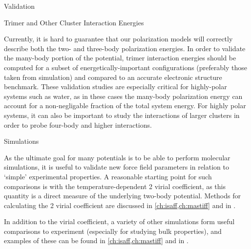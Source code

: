 \begin{subsection}{Validation}

\begin{paragraph}{Trimer and Other Cluster Interaction Energies}

Currently, it is hard to guarantee that our polarization models will
correctly describe both the two- and three-body polarization energies. In
order to validate the many-body portion of the potential, trimer
interaction energies should be computed for a subset of energetically-important configurations
(preferably those taken from simulation) and compared to an accurate
electronic structure benchmark. These validation studies are especially
critical for highly-polar systems such as water, as in these cases the
many-body polarization energy can account for a non-negligable fraction of the
total system energy. For highly polar systems, it can also be important to study
the interactions of larger clusters in order to probe four-body and higher
interactions.\cite{Medders2015a,Cisneros2016,Medders2013}

\end{paragraph}

\begin{paragraph}{Simulations}

As the ultimate goal for many potentials is to be able to perform molecular
simulations, it is useful to validate new force field parameters in relation
to `simple' experimental properties. A reasonable starting point for such
comparisons is with the temperature-dependent 2 virial coefficient, as this quantity is a
direct measure of the underlying two-body potential. Methods for calculating
the 2 virial coefficient are discussed in \cref{ch:isaff,ch:mastiff}
and in .

In addition to the virial coefficient, a variety of other simulations form
useful comparisons to experiment (especially for studying bulk properties),
and examples of these can be found in 
\cref{ch:isaff,ch:mastiff} and in .

\end{paragraph}


\end{subsection}
